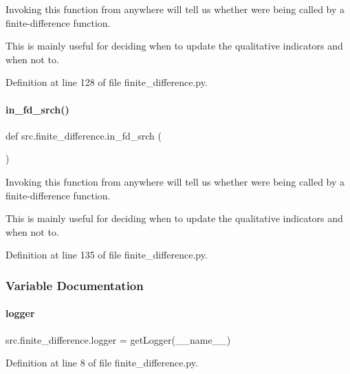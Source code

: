 Invoking this function from anywhere will tell us whether we\textquotesingle{}re being called by a finite-\/difference function. 

This is mainly useful for deciding when to update the \textquotesingle{}qualitative indicators\textquotesingle{} and when not to. 

Definition at line 128 of file finite\+\_\+difference.\+py.

\mbox{\label{namespacesrc_1_1finite__difference_af62619af114a030e945e0963a8d25090}} 
\paragraph{\texorpdfstring{in\+\_\+fd\+\_\+srch()}{in\_fd\_srch()}}
{\footnotesize\ttfamily def src.\+finite\+\_\+difference.\+in\+\_\+fd\+\_\+srch (\begin{DoxyParamCaption}{ }\end{DoxyParamCaption})}



Invoking this function from anywhere will tell us whether we\textquotesingle{}re being called by a finite-\/difference function. 

This is mainly useful for deciding when to update the \textquotesingle{}qualitative indicators\textquotesingle{} and when not to. 

Definition at line 135 of file finite\+\_\+difference.\+py.



\subsubsection{Variable Documentation}
\mbox{\label{namespacesrc_1_1finite__difference_a75d4771fe24a9e75631674733a10cfa9}} 
\paragraph{\texorpdfstring{logger}{logger}}
{\footnotesize\ttfamily src.\+finite\+\_\+difference.\+logger = get\+Logger(\+\_\+\+\_\+name\+\_\+\+\_\+)}



Definition at line 8 of file finite\+\_\+difference.\+py.

